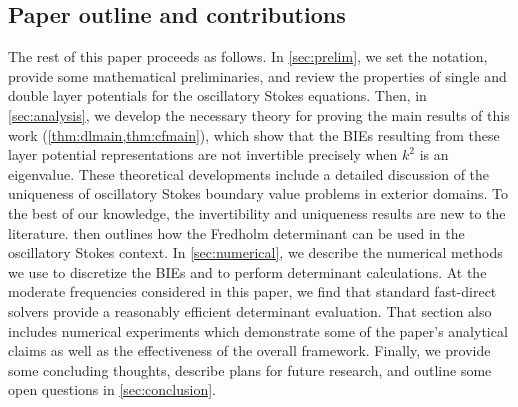 \subsection{Paper outline and contributions}

The rest of this paper proceeds as follows.
%
In \cref{sec:prelim}, we set the notation, provide some
mathematical preliminaries, and review the
properties of single and double layer potentials
for the oscillatory Stokes equations.
%
Then, in \cref{sec:analysis}, we develop the necessary
theory for proving the main results of this work 
(\cref{thm:dlmain,thm:cfmain}),
which show that the BIEs resulting from these
layer potential representations are not invertible
precisely when $k^2$ is an eigenvalue.
%
These theoretical developments include a detailed
discussion of the uniqueness of oscillatory Stokes
boundary value problems in exterior domains.
%
To the best of our knowledge, the invertibility
and uniqueness results are new to the literature.
%
 then outlines how the Fredholm determinant
can be used in the oscillatory Stokes context.
%
In \cref{sec:numerical}, we describe the numerical
methods we use to discretize the BIEs and to perform
determinant calculations.
%
At the moderate frequencies considered in this
paper, we find that standard fast-direct
solvers provide a reasonably efficient determinant
evaluation.
%
That section also includes numerical experiments
which demonstrate some of the paper's analytical
claims as well as the effectiveness of the overall
framework.
%
Finally, we provide some concluding thoughts,
describe plans for future research,
and outline some open questions in
\cref{sec:conclusion}.
